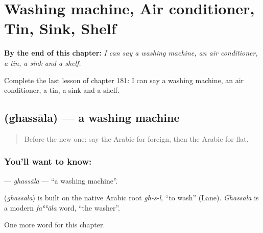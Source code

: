 
\chapter{Washing machine, Air conditioner, Tin, Sink, Shelf}
\label{ch:ar-washing-machine-air-conditioner-tin-sink-shelf}

\begin{chapteropening}
\textbf{By the end of this chapter:} \emph{I can say a washing machine, an air conditioner, a tin, a sink and a shelf.}

Complete the last lesson of chapter 181: I can say a washing machine, an air conditioner, a tin, a sink and a shelf.
\end{chapteropening}

\section[\texorpdfstring{\ar{غسالة} (ghassāla)}{غسالة (ghassāla)}]{ (ghassāla) — a washing machine}

\label{lesson:AR-C181-ghassala}



\begin{quote}
Before the new one: say the Arabic for foreign, then the Arabic for flat.
\end{quote}

\subsection*{You'll want to know: }
\textbf{} — \emph{ghassāla} — \textquotedblleft{}a washing machine\textquotedblright{}.

\begin{cousinweb}
\textbf{} (\emph{ghassāla}) is built on the native Arabic root \emph{gh-s-l}, \textquotedblleft{}to wash\textquotedblright{} (Lane). \emph{Ghassāla} is a modern \emph{faʿʿāla} word, \textquotedblleft{}the washer\textquotedblright{}.
\end{cousinweb}

\begin{grammarlens}[title={What you've built}]
One more word for this chapter.
\end{grammarlens}

